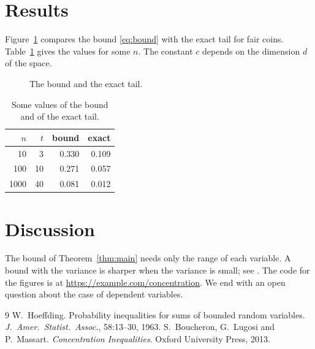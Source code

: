 \documentclass[11pt]{article}
\begin{document}
\section{Results}\label{sec:results}
Figure~\ref{fig:tail} compares the bound \eqref{eq:bound} with the exact tail for fair coins.
Table~\ref{tab:values} gives the values for some $n$. The constant $c$ depends on the dimension $d$ of the space.
\begin{figure}[h]
\centering
{}
\caption{The bound and the exact tail.}\label{fig:tail}
\end{figure}
\begin{table}[h]
\centering
\begin{tabular}{rrrr}\toprule
$n$ & $t$ & bound & exact \\\midrule
10 & 3 & 0.330 & 0.109 \\
100 & 10 & 0.271 & 0.057 \\
1000 & 40 & 0.081 & 0.012 \\\bottomrule
\end{tabular}
\caption{Some values of the bound and of the exact tail.}\label{tab:values}
\end{table}

\section{Discussion}
The bound of Theorem~\ref{thm:main} needs only the range of each variable.
A bound with the variance is sharper when the variance is small; see \cite{boucheron2013}.
The code for the figures is at \url{https://example.com/concentration}.
We end with an open question about the case of dependent variables.

\begin{thebibliography}{9}
 W.~Hoeffding. Probability inequalities for sums of bounded random variables.
\emph{J.\ Amer.\ Statist.\ Assoc.}, 58:13--30, 1963.
 S.~Boucheron, G.~Lugosi and P.~Massart. \emph{Concentration Inequalities}.
Oxford University Press, 2013.
\end{thebibliography}
\end{document}
